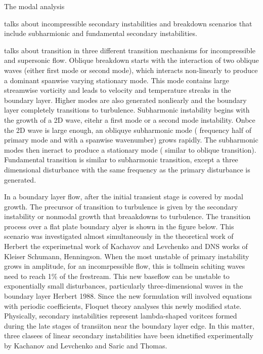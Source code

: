 The modal analysis 

\cite{Herbert1988} talks about incompressible secondary instabilities and breakdown scenarios that include subharmionic and fundamental secondary instabilities. 

\cite{SchmidHenningson2001} talks about transition in three different transition mechanisms for incompressible and supersonic flow. Oblique breakdown starts with the interaction of two oblique waves (either first mode or second mode), which interacts non-linearly to produce a dominant spanwise varying stationary mode. This mode contains large streamwise vorticity and leads to velocity and temperature streaks in the boundary layer. Higher modes are also generated nonliearly and the boundary layer completely transitions to turbulence. Subharmonic instability begins with the growth of a 2D wave, eitehr a first mode or a second mode instability. Onbce the 2D wave is large enough, an obliquye subharmonic mode ( frequency half of primary mode and with a spanwise wavenumber) grows rapidly. The subharmonic modes then ineract to produce a stationary mode ( similar to oblique transition). Fundamental transition is similar to
subharmonic transition, except a three dimensional disturbance with the same frequency as the primary disturbance is generated. 


In a boundary layer flow, after the initial transient stage is covered by modal growth. The precursor of transition to turbulence is given by the secondary instability or nonmodal growth that breaakdowns to turbulence.  The transition process over a flat plate boundary alyer is shown in the figure below. This scenario was investigated almost simultaneously in the theoretical work of Herbert  the experimetnal work of Kachavov and Levchenko and DNS works of Kleiser Schumann, Henningson. When the most unstable of primary instability grows in amplitude, for an incomrpessible flow, this is tollmein schiting waves need to reach 1\% of the  frestream. This new baseflow can be unstable to exponentially small disturbances, particularly three-dimensional waves in the boundary layer Herbert 1988. Since the new formulation will involved equations with periodic coefficients, Floquet theory analyses this newly modified state. Physically, secondary instabilities represent lambda-shaped voritces formed during the late stages of transiiton near the boundary layer edge. In this matter, three clasees of linear secondary instabilities have been idnetified experimentally by Kachanov and Levchenko and Saric and Thomas. 


